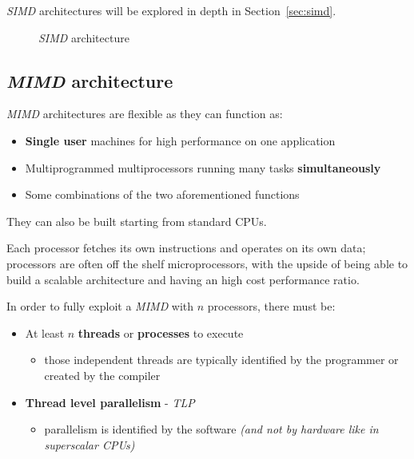 \documentclass[english]{article}
\begin{document}
\bigskip
\textit{SIMD} architectures will be explored in depth in Section~\ref{sec:simd}.

\begin{figure}[htbp]
  \bigskip
  \centering
  \caption{\textit{SIMD} architecture}
  \label{fig:simd-architecture}
  \bigskip
\end{figure}

\subsection{\textit{MIMD} architecture}

\textit{MIMD} architectures are flexible as they can function as:

\begin{itemize}
  \item \textbf{Single user} machines for high performance on one application
  \item Multiprogrammed multiprocessors running many tasks \textbf{simultaneously}
  \item Some combinations of the two aforementioned functions
\end{itemize}

They can also be built starting from standard CPUs.

\bigskip
Each processor fetches its own instructions and operates on its own data;
processors are often off the shelf microprocessors, with the upside of being able to build a scalable architecture and having an high cost performance ratio.

In order to fully exploit a \textit{MIMD} with \(n\) processors, there must be:

\begin{itemize}
  \item At least \(n\) \textbf{threads} or \textbf{processes}  to execute
        \begin{itemize}
          \item those independent threads are typically identified by the programmer or created by the compiler
        \end{itemize}
  \item \textbf{Thread level parallelism} - \textit{TLP}
        \begin{itemize}
          \item parallelism is identified by the software \textit{(and not by hardware like in superscalar CPUs)}
        \end{itemize}
\end{itemize}
\end{document}
